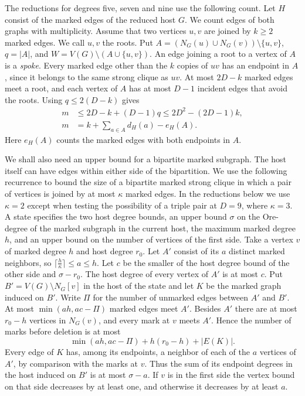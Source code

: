 The reductions for degrees five, seven and nine use the following count. Let $H$ consist of the marked edges of the reduced host $G$.
We count edges of both graphs with multiplicity. Assume that two
vertices $u,v$ are joined by $k\geq2$ marked edges. We call $u,v$
the roots. Put $A=(N_G(u)\cup N_G(v))\setminus\{u,v\}$,
$q=|A|$, and $W=V(G)\setminus(A\cup\{u,v\})$. An edge
joining a root to a vertex of $A$ is a \emph{spoke}. Every
marked edge other than the $k$ copies of $uv$ has an endpoint
in $A$, since it belongs to the same strong clique as $uv$.
At most $2D-k$ marked edges meet a root, and each vertex of
$A$ has at most $D-1$ incident edges that avoid the roots.
Using $q\le 2(D-k)$ gives
\begin{equation}\label{eq:multi-root-pair-budget}
\begin{aligned}
 m&\le 2D-k+(D-1)q\le 2D^2-(2D-1)k,\\
 m&=k+\sum_{a\in A}d_H(a)-e_H(A).
\end{aligned}
\end{equation}
Here $e_H(A)$ counts the marked edges with both endpoints in $A$.

We shall also need an upper bound for a bipartite marked subgraph.
The host itself can have edges within either side of the bipartition.
We use the following recurrence to bound the size of a
bipartite marked strong clique in which a pair of vertices is joined
by at most $\kappa$ marked edges. In the reductions below we use
$\kappa=2$ except when testing the possibility of a triple pair at
$D=9$, where $\kappa=3$. A state specifies the two host degree bounds,
an upper bound $\sigma$ on the Ore-degree of the marked subgraph
in the current host, the maximum
marked degree $h$, and an upper bound on the number of
vertices of the first side. Take a vertex $v$ of marked
degree $h$ and host degree $r_0$. Let $A'$ consist of its
$a$ distinct marked neighbors, so $\lceil\frac{h}{\kappa}\rceil\le a\le h$.
Let $c$ be the smaller of the host degree bound of the other
side and $\sigma-r_0$. The host degree of every vertex of
$A'$ is at most $c$. Put $B'=V(G)\setminus N_G[v]$ in the
host of the state and let $K$ be the marked graph induced on
$B'$. Write $\Pi$ for the number of unmarked edges between
$A'$ and $B'$. At most $\min(ah,ac-\Pi)$ marked edges
meet $A'$. Besides $A'$ there are at most $r_0-h$ vertices
in $N_G(v)$, and every mark at $v$ meets $A'$. Hence the
number of marks before deletion is at most
\begin{equation}\label{eq:finite-bipartite-root-count}
 \min(ah,ac-\Pi)+h(r_0-h)+|E(K)|.
\end{equation}
Every edge of $K$ has, among its endpoints, a neighbor of
each of the $a$ vertices of $A'$, by comparison with the
marks at $v$. Thus the sum of its endpoint degrees in the host
induced on $B'$ is at most $\sigma-a$. If $v$ is in the first side
the vertex bound on that side decreases by at least one,
and otherwise it decreases by at least $a$.

